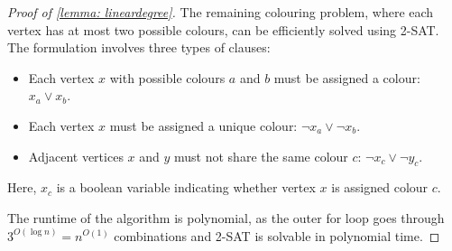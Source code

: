 \begin{proof}[Proof of \cref{lemma: lineardegree}]
The remaining colouring problem, where each vertex has at most two possible colours, can be efficiently solved using 2-SAT. The formulation involves three types of clauses:

\begin{itemize}
    \item Each vertex $x$ with possible colours $a$ and $b$ must be assigned a colour: $x_a \lor x_b$.
    \item Each vertex $x$ must be assigned a unique colour: $\neg x_a \lor \neg x_b$.
    \item Adjacent vertices $x$ and $y$ must not share the same colour $c$: $\neg x_c \lor \neg y_c$.
\end{itemize}

Here, $x_c$ is a boolean variable indicating whether vertex $x$ is assigned colour $c$.

The runtime of the algorithm is polynomial, as the outer for loop goes through $3^{O(\log{n})}=n^{O(1)}$ combinations and 2-SAT is solvable in polynomial time.

\end{proof}
